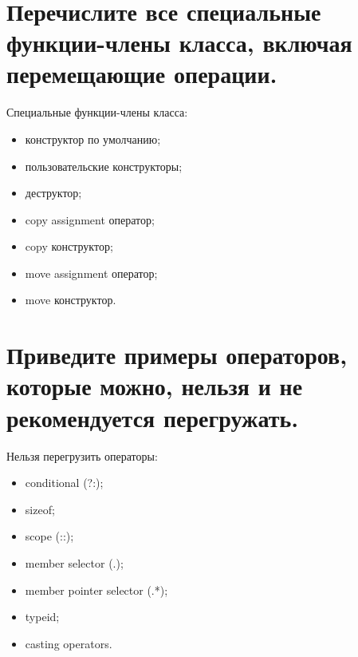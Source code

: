 \documentclass[a4paper,12pt]{article}	%
\title{
	\center{\textbf{Контрольные вопросы}}
	}
\begin{document}

\maketitle

\section{Перечислите все специальные функции-члены класса, включая перемещающие операции.}
	
Специальные функции-члены класса:

	\begin{itemize}
	 
	\item конструктор по умолчанию;

	\item пользовательские конструкторы;
	
	\item деструктор;
	
	\item copy assignment оператор;
	
	\item copy конструктор;
	
	\item move assignment оператор;
	
	\item move конструктор.
	
	\end{itemize}

\newpage

\section{Приведите примеры операторов, которые можно, нельзя и не рекомендуется перегружать.}

	Нельзя перегрузить операторы:
	
	\begin{itemize}
	
	\item conditional (?:);
	\item sizeof;
	\item scope (::);
	\item member selector (.);
	\item member pointer selector (.*);
	\item typeid;
	\item casting operators.
	
	\end{itemize}
\end{document}
